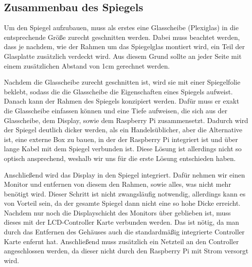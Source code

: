 \documentclass[11pt,a4paper]{article}
\begin{document}
\subsection{Zusammenbau des Spiegels}
Um den Spiegel aufzubauen, muss als erstes eine Glasscheibe (Plexiglas) in die entsprechende Größe zurecht geschnitten werden. Dabei muss beachtet werden, dass je nachdem, wie der Rahmen um das Spiegelglas montiert wird, ein Teil der Glasplatte zusätzlich verdeckt wird. Aus diesem Grund sollte an jeder Seite mit einem zusätzlichen Abstand von 1cm gerechnet werden.
\par
Nachdem die Glasscheibe zurecht geschnitten ist, wird sie mit einer Spiegelfolie beklebt, sodass die die Glasscheibe die Eigenschaften eines Spiegels aufweist. Danach kann der Rahmen des Spiegels konzipiert werden. Dafür muss er exakt die Glasscheibe einfassen können und eine Tiefe aufweisen, die sich aus der Glasscheibe, dem Display, sowie dem Raspberry Pi zusammensetzt. Dadurch wird der Spiegel deutlich dicker werden, als ein Handelsüblicher, aber die Alternative ist, eine externe Box zu bauen, in der der Raspberry Pi integriert ist und über lange Kabel mit dem Spiegel verbunden ist. Diese Lösung ist allerdings nicht so optisch ansprechend, weshalb wir uns für die erste Lösung entschieden haben.
\par
Anschließend wird das Display in den Spiegel integriert. Dafür nehmen wir einen Monitor und entfernen von diesem den Rahmen, sowie alles, was nicht mehr benötigt wird. Dieser Schritt ist nicht zwangsläufig notwendig, allerdings kann es von Vorteil sein, da der gesamte Spiegel dann nicht eine so hohe Dicke erreicht. Nachdem nur noch die Displayschicht des Monitors über geblieben ist, muss dieses mit der LCD-Controller Karte verbunden werden. Das ist nötig, da man durch das Entfernen des Gehäuses auch die standardmäßig integrierte Controller Karte enfernt hat. Anschließend muss zusätzlich ein Netzteil an den Controller angeschlossen werden, da dieser nicht durch den Raspberry Pi mit Strom versorgt wird. 
\end{document}
